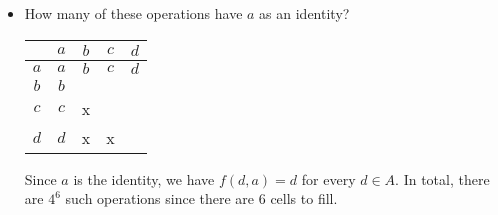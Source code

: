 \documentclass[11pt]{article}
\begin{document}
\begin{itemize}
        \item How many of these operations have $a$ as an identity?
        \begin{center}
            \begin{tabular}{| c | c | c | c | c |} \hline
                     & $a$ & $b$ & $c$ & $d$ \\ \hline
                 $a$ & $a$ & $b$ & $c$ & $d$ \\ \hline
                 $b$ & $b$ &     &     &     \\ \hline
                 $c$ & $c$ &  x  &     &     \\ \hline
                 $d$ & $d$ &  x  &  x  &     \\ \hline
            \end{tabular}
        \end{center}
        Since $a$ is the identity, we have \(f(d,a) = d\) for every \(d \in A\). In total, there are \(4^6\) such operations since there are 6 cells to fill.
    \end{itemize}
\end{document}
